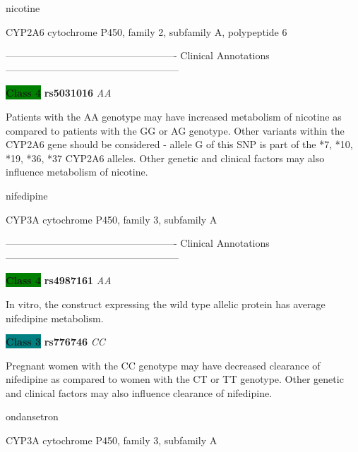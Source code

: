 \documentclass{resume} %
\begin{document}
\begin{rSection}{ nicotine }
\begin{rSubsection}{ CYP2A6 }{ cytochrome P450, family 2, subfamily A, polypeptide 6 }{}{}
\item[] ---------------------------------------------------- Clinical Annotations -----------------------------------------------------\newline
\item \textbf{\colorbox{green} {Class 4}} \textbf{ rs5031016 } \textit{ AA }
\item[] Patients with the AA genotype may have increased metabolism of nicotine as compared to patients with the GG or AG genotype. Other variants within the CYP2A6 gene should be considered - allele G of this SNP is part of the *7, *10, *19, *36, *37 CYP2A6 alleles. Other genetic and clinical factors may also influence metabolism of nicotine.
\end{rSubsection}

\end{rSection}\begin{rSection}{ nifedipine }
\item[]

\begin{rSubsection}{ CYP3A }{ cytochrome P450, family 3, subfamily A }{}{}
\item[]

\item[] ---------------------------------------------------- Clinical Annotations -----------------------------------------------------\newline
\item \textbf{\colorbox{green} {Class 4}} \textbf{ rs4987161 } \textit{ AA }
\item[] In vitro, the construct expressing the wild type allelic protein has average nifedipine metabolism.\item \textbf{\colorbox{teal} {Class 3}} \textbf{ rs776746 } \textit{ CC }
\item[] Pregnant women with the CC genotype may have decreased clearance of nifedipine as compared to women with the CT or TT genotype. Other genetic and clinical factors may also influence clearance of nifedipine.
\end{rSubsection}

\end{rSection}\begin{rSection}{ ondansetron }
\item[]

\begin{rSubsection}{ CYP3A }{ cytochrome P450, family 3, subfamily A }{}{}
\item[]


\end{rSubsection}
\end{rSection}
\end{document}
